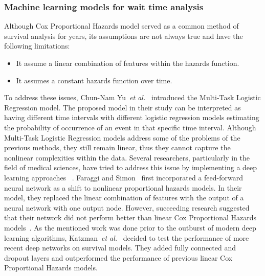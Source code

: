 \subsubsection{Machine learning models for wait time analysis}
Although Cox Proportional Hazards model served as a common method of survival analysis for years, its assumptions are not always true and have the following limitations:
\begin{itemize}
    \item It assume a linear combination of features within the hazards function.
    \item It assumes a constant hazards function over time.
\end{itemize}
To address these issues, Chun-Nam Yu~\textit{et al.}~\cite{yu2011learning} introduced the Multi-Task Logistic Regression model. The proposed model in their study can be interpreted as having different time intervals with different logistic regression models estimating the probability of occurrence of an event in that specific time interval. Although Multi-Task Logistic Regression models address some of the problems of the previous methods, they still remain linear, thus they cannot capture the nonlinear complexities within the data. Several researchers, particularly in the field of medical sciences, have tried to address this issue by implementing a deep learning approaches ~\cite{faraggi1995neural,katzman2016deep,luck2017deep}. Faraggi and Simon~ \cite{faraggi1995neural} first incorporated a feed-forward neural network as a shift to nonlinear proportional hazards models. In their model, they replaced the linear combination of features with the output of a neural network with one output node. However, succeeding research suggested that their network did not perform better than linear Cox Proportional Hazards models~\cite{mariani1997prognostic}. As the mentioned work was done prior to the outburst of modern deep learning algorithms, Katzman~\textit{et al.}~\cite{katzman2016deep} decided to test the performance of more recent deep networks on survival models. They added fully connected and dropout layers and outperformed the performance of previous linear Cox Proportional Hazards models.

